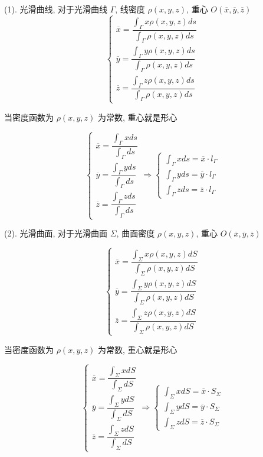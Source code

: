 \begin{theorem}[重心公式]

	(1). 光滑曲线, 对于光滑曲线 $\Gamma$, 线密度 $\rho(x,y,z)$, 重心 $O(\overline{x}, \overline{y}, \overline{z})$
	$$\begin{cases}
		\overline{x} = \dfrac{\int_{\Gamma}x\rho(x,y,z)ds}{\int_{\Gamma}\rho(x,y,z)ds} \\
		\overline{y} = \dfrac{\int_{\Gamma}y\rho(x,y,z)ds}{\int_{\Gamma}\rho(x,y,z)ds} \\
		\overline{z} = \dfrac{\int_{\Gamma}z\rho(x,y,z)ds}{\int_{\Gamma}\rho(x,y,z)ds}
	\end{cases}$$
	
	当密度函数为 $\rho(x,y,z)$ 为常数, 重心就是形心

	$$\begin{cases}
		\overline{x} = \dfrac{\int_{\Gamma}xds}{\int_{\Gamma}ds} \\
		\overline{y} = \dfrac{\int_{\Gamma}yds}{\int_{\Gamma}ds} \\
		\overline{z} = \dfrac{\int_{\Gamma}zds}{\int_{\Gamma}ds}
	\end{cases}\Rightarrow 
	\begin{cases}
		\int_{\Gamma}xds = \overline{x}\cdot l_{\Gamma}\\
		\int_{\Gamma}yds = \overline{y}\cdot l_{\Gamma}\\
		\int_{\Gamma}zds = \overline{z}\cdot l_{\Gamma}
	\end{cases}$$

	(2). 光滑曲面, 对于光滑曲面 $\Sigma$, 曲面密度 $\rho(x,y,z)$, 重心 $O(\overline{x}, \overline{y}, \overline{z})$

	$$\begin{cases}
		\overline{x} = \dfrac{\int_{\Sigma}x\rho(x,y,z)dS}{\int_{\Sigma}\rho(x,y,z)dS} \\
		\overline{y} = \dfrac{\int_{\Sigma}y\rho(x,y,z)dS}{\int_{\Sigma}\rho(x,y,z)dS} \\
		\overline{z} = \dfrac{\int_{\Sigma}z\rho(x,y,z)dS}{\int_{\Sigma}\rho(x,y,z)dS}
	\end{cases}$$
	
	当密度函数为 $\rho(x,y,z)$ 为常数, 重心就是形心

	$$\begin{cases}
		\overline{x} = \dfrac{\int_{\Sigma}xdS}{\int_{\Sigma}dS} \\
		\overline{y} = \dfrac{\int_{\Sigma}ydS}{\int_{\Sigma}dS} \\
		\overline{z} = \dfrac{\int_{\Sigma}zdS}{\int_{\Sigma}dS}
	\end{cases}\Rightarrow 
	\begin{cases}
		\int_{\Sigma}xdS = \overline{x}\cdot S_{\Sigma}\\
		\int_{\Sigma}ydS = \overline{y}\cdot S_{\Sigma}\\
		\int_{\Sigma}zdS = \overline{z}\cdot S_{\Sigma}
	\end{cases}$$
\end{theorem}

